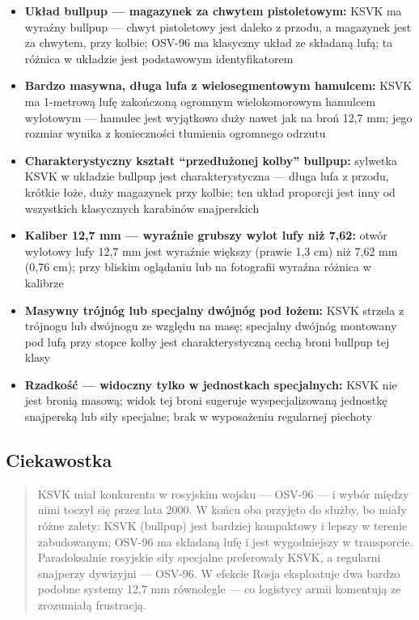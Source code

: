 \documentclass[12pt,oneside]{book}
\providecommand{\tightlist}{%
  \setlength{\itemsep}{0pt}\setlength{\parskip}{0pt}}
\begin{document}
\begin{itemize}
\tightlist
\item
  \textbf{Układ bullpup --- magazynek za chwytem pistoletowym:} KSVK ma
  wyraźny bullpup --- chwyt pistoletowy jest daleko z przodu, a
  magazynek jest za chwytem, przy kolbie; OSV-96 ma klasyczny układ ze
  składaną lufą; ta różnica w układzie jest podstawowym identyfikatorem
\item
  \textbf{Bardzo masywna, długa lufa z wielosegmentowym hamulcem:} KSVK
  ma 1-metrową lufę zakończoną ogromnym wielokomorowym hamulcem
  wylotowym --- hamulec jest wyjątkowo duży nawet jak na broń 12,7 mm;
  jego rozmiar wynika z konieczności tłumienia ogromnego odrzutu
\item
  \textbf{Charakterystyczny kształt ``przedłużonej kolby'' bullpup:}
  sylwetka KSVK w układzie bullpup jest charakterystyczna --- długa lufa
  z przodu, krótkie łoże, duży magazynek przy kolbie; ten układ
  proporcji jest inny od wszystkich klasycznych karabinów snajperskich
\item
  \textbf{Kaliber 12,7 mm --- wyraźnie grubszy wylot lufy niż 7,62:}
  otwór wylotowy lufy 12,7 mm jest wyraźnie większy (prawie 1,3 cm) niż
  7,62 mm (0,76 cm); przy bliskim oglądaniu lub na fotografii wyraźna
  różnica w kalibrze
\item
  \textbf{Masywny trójnóg lub specjalny dwójnóg pod łożem:} KSVK strzela
  z trójnogu lub dwójnogu ze względu na masę; specjalny dwójnóg
  montowany pod lufą przy stopce kolby jest charakterystyczną cechą
  broni bullpup tej klasy
\item
  \textbf{Rzadkość --- widoczny tylko w jednostkach specjalnych:} KSVK
  nie jest bronią masową; widok tej broni sugeruje wyspecjalizowaną
  jednostkę snajperską lub siły specjalne; brak w wyposażeniu regularnej
  piechoty
\end{itemize}

\subsection{Ciekawostka}\label{ciekawostka-80}

\begin{quote}
KSVK miał konkurenta w rosyjskim wojsku --- OSV-96 --- i wybór między
nimi toczył się przez lata 2000. W końcu oba przyjęto do służby, bo
miały różne zalety: KSVK (bullpup) jest bardziej kompaktowy i lepszy w
terenie zabudowanym; OSV-96 ma składaną lufę i jest wygodniejszy w
transporcie. Paradoksalnie rosyjskie siły specjalne preferowały KSVK, a
regularni snajperzy dywizyjni --- OSV-96. W efekcie Rosja eksploatuje
dwa bardzo podobne systemy 12,7 mm równolegle --- co logistycy armii
komentują ze zrozumiałą frustracją.
\end{quote}
\end{document}
